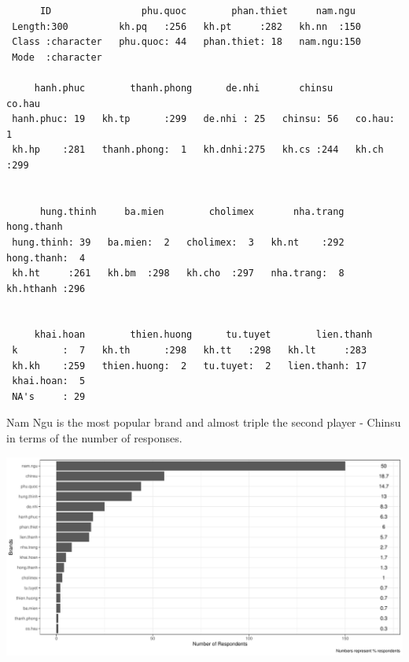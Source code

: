 \documentclass[]{article}
\begin{document}
\begin{verbatim}
      ID                phu.quoc        phan.thiet     nam.ngu   
 Length:300         kh.pq   :256   kh.pt     :282   kh.nn  :150  
 Class :character   phu.quoc: 44   phan.thiet: 18   nam.ngu:150  
 Mode  :character                                                
                                                                 
     hanh.phuc        thanh.phong      de.nhi       chinsu       co.hau   
 hanh.phuc: 19   kh.tp      :299   de.nhi : 25   chinsu: 56   co.hau:  1  
 kh.hp    :281   thanh.phong:  1   kh.dnhi:275   kh.cs :244   kh.ch :299  
                                                                          
                                                                          
      hung.thinh     ba.mien        cholimex       nha.trang        hong.thanh 
 hung.thinh: 39   ba.mien:  2   cholimex:  3   kh.nt    :292   hong.thanh:  4  
 kh.ht     :261   kh.bm  :298   kh.cho  :297   nha.trang:  8   kh.hthanh :296  
                                                                               
                                                                               
     khai.hoan        thien.huong      tu.tuyet        lien.thanh 
 k        :  7   kh.th      :298   kh.tt   :298   kh.lt     :283  
 kh.kh    :259   thien.huong:  2   tu.tuyet:  2   lien.thanh: 17  
 khai.hoan:  5                                                    
 NA's     : 29                                                    
\end{verbatim}

Nam Ngu is the most popular brand and almost triple the second player -
Chinsu in terms of the number of responses.

\includegraphics{Consumer-attitude-towards-fish-sauce-products_files/figure-latex/unnamed-chunk-11-1.pdf}
\end{document}
